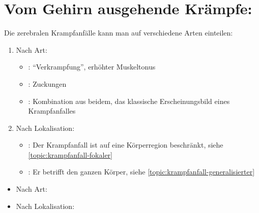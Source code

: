 

\section{Vom Gehirn ausgehende Krämpfe: }
\label{topic:zerebrale-krampfanfaelle}
\label{topic:krampfanfall}




{%
Die zerebralen Krampfanfälle kann man auf verschiedene Arten
einteilen:
\begin{enumerate}
  \item Nach Art:
  \begin{itemize}
    \item {}: \enquote{Verkrampfung}, erhöhter
    Muskeltonus
    \item {}: Zuckungen
    \item {}: Kombination aus beidem, das
    klassische Erscheinungsbild eines Krampfanfalles
  \end{itemize}
  \item Nach Lokalisation:
  \begin{itemize}
    \item {}: Der Krampfanfall ist auf
    eine Körperregion beschränkt, siehe
    \ref{topic:krampfanfall-fokaler}
    \item {}: Er betrifft den
    ganzen Körper, siehe
    \ref{topic:krampfanfall-generalisierter}
    
  \end{itemize}
\end{enumerate}
}{%
\begin{itemize}
  \item Nach Art:
  \item Nach Lokalisation:
\end{itemize}
}{}{}{}

